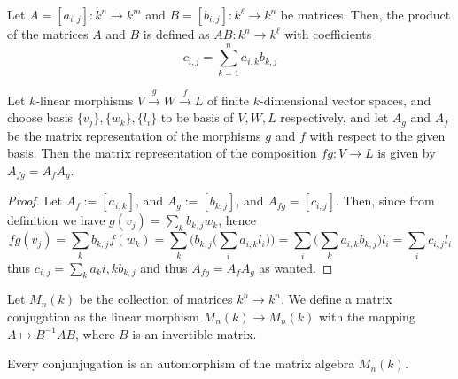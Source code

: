 \begin{definition}\label{def: matrix multiplication}
  Let \(A = [a_{i,j}] : k^n \to k^m\) and \(B = [b_{i, j}] : k^\ell \to k^n\) be
  matrices. Then, the product of the matrices \(A\) and \(B\) is defined as
  \(AB : k^n \to k^\ell\) with coefficients
  \[
    c_{i, j} = \sum_{k=1}^n a_{i, k} b_{k, j}
  \]
\end{definition}

\begin{proposition}
  \label{prop: matrix of the composition}
  Let \(k\)-linear morphisms \(V \xrightarrow g W \xrightarrow f L\) of finite
  \(k\)-dimensional vector spaces, and choose basis \(\{v_j\}, \{w_k\}, \{l_i\}\)
  to be basis of \(V, W, L\) respectively, and let \(A_g\) and \(A_f\) be the
  matrix representation of the morphisms \(g\) and \(f\) with respect to the
  given basis. Then the matrix representation of the composition \(f  g: V
  \to L\) is given by \(A_{f  g} = A_f A_g\).
\end{proposition}

\begin{proof}
  Let \(A_f := [a_{i, k}]\), and \(A_g := [b_{k, j}]\), and \(A_{f  g} =
  [c_{i, j}]\). Then, since from definition we have \(g(v_j) = \sum_k b_{k, j}
  w_k\), hence
  \[
    f  g(v_j) =
    \sum_k b_{k, j} f(w_k) =
    \sum_k \bigg( b_{k, j} \bigg( \sum_i a_{i, k} l_i \bigg) \bigg)
    = \sum_i \bigg( \sum_k a_{i, k} b_{k, j} \bigg) l_i
    = \sum_i c_{i, j} l_i
  \]
  thus \(c_{i, j} = \sum_k a_k{i, k} b_{k, j}\) and thus \(A_{f  g} = A_f
  A_g\) as wanted.
\end{proof}

\begin{definition}[Conjugation]\label{def: matrix conjugation}
  Let \(M_n(k)\) be the collection of matrices \(k^n \to k^n\). We define a
  matrix conjugation as the linear morphism \(M_n(k) \to M_n(k)\) with the
  mapping \(A \mapsto B^{-1} A B\), where \(B\) is an invertible matrix.
\end{definition}

\begin{proposition}
  Every conjunjugation is an automorphism of the matrix algebra \(M_n(k)\).
\end{proposition}
